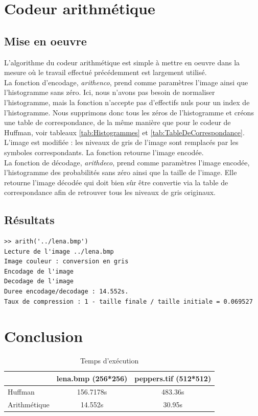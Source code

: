 \documentclass[a4paper, 12pt]{article}
\begin{document}
\section{Codeur arithmétique}

\subsection{Mise en oeuvre}

L'algorithme du codeur arithmétique est simple à mettre en oeuvre dans la mesure où le travail effectué précédemment est largement utilisé. \\

La fonction d'encodage, \textit{arithenco}, prend comme paramètres l'image ainsi que l'histogramme sans zéro. Ici, nous n'avons pas besoin de normaliser l'histogramme, mais la fonction n'accepte pas d'effectifs nuls pour un index de l'histogramme. Nous supprimons donc tous les zéros de l'histogramme et créons une table de correspondance, de la même manière que pour le codeur de Huffman, voir tableaux \ref{tab:Histogrammes} et \ref{tab:TableDeCorrespondance}. L'image est modifiée : les niveaux de gris de l'image sont remplacés par les symboles correspondants. La fonction retourne l'image encodée.\\

La fonction de décodage, \textit{arithdeco}, prend comme paramètres l'image encodée, l'histogramme des probabilités sans zéro ainsi que la taille de l'image. Elle retourne l'image décodée qui doit bien sûr être convertie via la table de correspondance afin de retrouver tous les niveaux de gris originaux. \\

\subsection{Résultats}

\begin{verbatim}
>> arith('../lena.bmp')
Lecture de l'image ../lena.bmp
Image couleur : conversion en gris
Encodage de l'image
Decodage de l'image
Duree encodage/decodage : 14.552s.
Taux de compression : 1 - taille finale / taille initiale = 0.069527
\end{verbatim}

\section{Conclusion}

\begin{table}[!h]
	\centering
		\begin{tabular}{l|c | c|}
			\cline{2-3}
			                                   & lena.bmp (256*256) & peppers.tif (512*512) \\
			\hline
			\multicolumn{1}{|l|}{Huffman}      & 156.7178s            & 483.36s               \\
			\hline
			\multicolumn{1}{|l|}{Arithmétique} & 14.552s              & 30.95s                \\
			\hline
		\end{tabular}
	\caption{Temps d’exécution}
	\label{tab:TableTempsExec}
\end{table}
\end{document}
